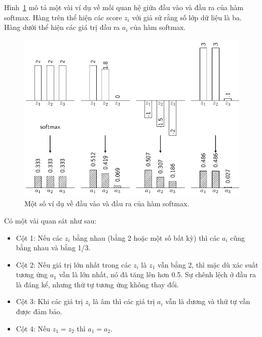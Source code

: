 Hình~\ref{fig:13_3} mô tả một vài ví dụ về mối quan hệ giữa đầu vào và đầu ra
của hàm softmax. Hàng trên thể hiện các score $z_i$ với giả sử rằng số lớp dữ
liệu là ba. Hàng dưới thể hiện các giá trị đầu ra $a_i$ của hàm softmax.


\begin{figure}[t]
\centering
\includegraphics[width =
.8\textwidth]{Chapters/05_NeuralNetworks/13_softmax/latex/softmax_ex.pdf}
\caption[]{Một số ví dụ về đầu vào và đầu ra của hàm softmax.}
\label{fig:13_3}
\end{figure}
\newpage
Có một vài quan sát như sau:
\begin{itemize}
\item Cột 1: Nếu các $z_i$ bằng nhau (bằng 2 hoặc một số bất kỳ) thì các $a_i$
cũng bằng nhau
và bằng 1/3.

\item Cột 2: Nếu giá trị lớn nhất trong các $z_i$ là $z_1$ vẫn bằng 2, thì mặc
dù xác suất
tương ứng $a_1$ vẫn là lớn nhất, nó đã tăng lên hơn 0.5. Sự chênh lệch ở
đầu ra là đáng kể, nhưng thứ tự tương ứng không thay đổi.

\item Cột 3: Khi các giá trị $z_i$ là âm thì các giá trị $a_i$ vẫn là dương và thứ tự vẫn được đảm bảo.

\item Cột 4: Nếu $z_1 = z_2$ thì $a_1 = a_2$.
\end{itemize}

